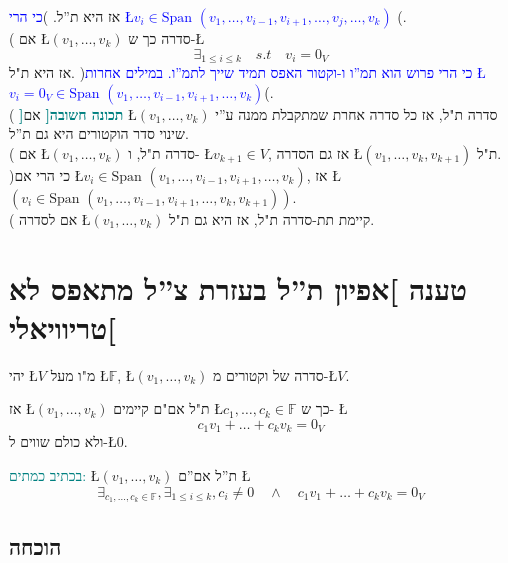 \documentclass[english,hebrew]{article}
\newcommand{\spn}{\text{Span }}
\begin{document}
אז היא ת\textquotedblright ל. )\textcolor{blue}{כי הרי \L{$v_{i}\in\spn(v_{1},\dots,v_{i-1},v_{i+1},\dots,v_{j},\dots,v_{k})$}}
(.\\

{\endL}( אם \L{$(v_{1},\dots,v_{k})$} סדרה כך ש-\L{%
\[
\exists_{1\leq i\leq k}\quad s.t\quad v_{i}=0_{V}
\]
}%
אז היא ת"ל. )\textcolor{blue}{כי הרי פרוש הוא תמ\textquotedblright ו
ו-וקטור האפס תמיד שייך לתמ\textquotedblright ו. במילים אחרות \L{$v_{i}=0_{V}\in\spn(v_{1},\dots,v_{i-1},v_{i+1},\dots,v_{k})$}}(.\\

{\endL}( \textbf{\textcolor{teal}{{]}תכונה חשובה{[}}} אם
\L{$(v_{1},\dots,v_{k})$} סדרה ת"ל, אז כל סדרה אחרת שמתקבלת ממנה
ע\textquotedblright י שינוי סדר הוקטורים היא גם ת\textquotedblright ל.\\

{\endL}( אם \L{$(v_{1},\dots,v_{k})$} סדרה ת"ל, ו- \L{$v_{k+1}\in V$},
אז גם הסדרה \L{$(v_{1},\dots,v_{k},v_{k+1})$} ת"ל. )כי הרי אם \L{$v_{i}\in\spn(v_{1},\dots,v_{i-1},v_{i+1},\dots,v_{k})$},
אז \L{$\left(v_{i}\in\spn(v_{1},\dots,v_{i-1},v_{i+1},\dots,v_{k},v_{k+1})\right)$}.\\

{\endL}( אם לסדרה \L{$(v_{1},\dots,v_{k})$} קיימת תת-סדרה
ת"ל, אז היא גם ת"ל.

\section{טענה {]}אפיון ת\textquotedblright ל בעזרת צ\textquotedblright ל מתאפס
לא טריוויאלי{[}}

יהי \L{$V$} מ"ו מעל \L{$\mathbb{F}$}, \L{$(v_{1},\dots,v_{k})$}
סדרה של וקטורים מ-\L{$V$}.

אז \L{$(v_{1},\dots,v_{k})$} ת"ל אם"ם קיימים \L{$c_{1},\dots,c_{k}\in\mathbb{F}$}
כך ש- \L{%
\[
c_{1}v_{1}+\dots+c_{k}v_{k}=0_{V}
\]
}%
ולא כולם שווים ל-\L{$0$}.

\medskip{}

\textcolor{teal}{בכתיב כמתים:} \L{$(v_{1},\dots,v_{k})$} ת\textquotedblright ל
אם\textquotedblright ם \L{%
\[
\exists_{c_{1},\dots,c_{k}\in\mathbb{F}},\exists_{1\leq i\leq k},c_{i}\neq0\quad\wedge\quad c_{1}v_{1}+\dots+c_{k}v_{k}=0_{V}
\]
}%

\subsection{הוכחה}
\end{document}
